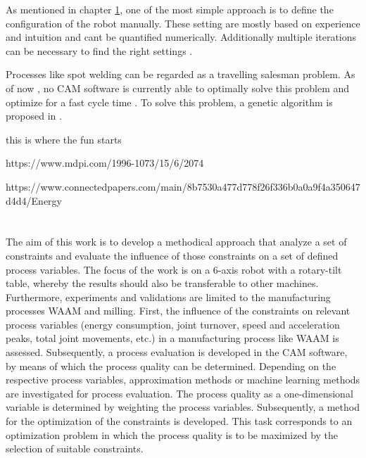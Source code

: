 \documentclass[ZLstudentexpose%
              ,optBiber%
              ,optEnglish%
              ,10pt
              ]{ZLlatex}%
\begin{document}
As mentioned in chapter \ref{}, one of the most simple approach is to define the configuration of the robot manually. These setting are mostly based on experience and intuition and cant be quantified numerically. Additionally multiple iterations can be necessary to find the right settings \cite{Pan}.


Processes like spot welding can be regarded as a travelling salesman problem. As of now , no CAM software is currently able to optimally solve this problem and optimize for a fast cycle time \cite{Pan}. To solve this problem, a genetic algorithm is proposed in \cite{Kim.2002}.

this is where the fun starts

https://www.mdpi.com/1996-1073/15/6/2074

https://www.connectedpapers.com/main/8b7530a477d778f26f336b0a0a9f4a350647d4d4/Energy%


\newpage
\section{}%
The aim of this work is to develop a methodical approach that analyze a set of constraints and evaluate the influence of those constraints on a set of defined process variables.
The focus of the work is on a 6-axis robot with a rotary-tilt table, whereby the results should also be transferable to other machines. Furthermore, experiments and validations are limited to the manufacturing processes WAAM and milling.
First, the influence of the constraints on relevant process variables (energy consumption, joint turnover, speed and acceleration peaks, total joint movements, etc.) in a manufacturing process like WAAM is assessed. Subsequently, a process evaluation is developed in the CAM software, by means of which the process quality can be determined.
Depending on the respective process variables, approximation methods or machine learning methods are investigated for process evaluation. The process quality as a one-dimensional variable is determined by weighting the process variables.
Subsequently, a method for the optimization of the constraints is developed. This task corresponds to an optimization problem in which the process quality is to be maximized by the selection of suitable constraints. 
\end{document}
